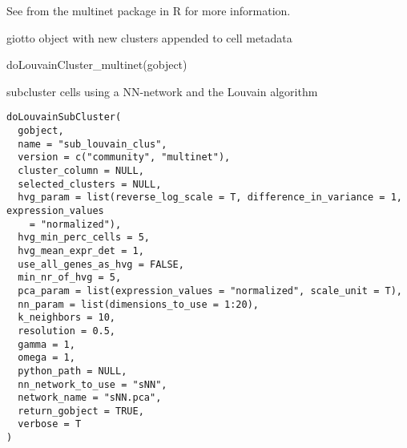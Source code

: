 \documentclass[a4paper]{book}
\begin{document}
%
\begin{Details}\relax
See  from the multinet package in R for
more information.
\end{Details}
%
\begin{Value}
giotto object with new clusters appended to cell metadata
\end{Value}
%
\begin{Examples}
\begin{ExampleCode}
    doLouvainCluster_multinet(gobject)
\end{ExampleCode}
\end{Examples}
%
\begin{Description}\relax
subcluster cells using a NN-network and the Louvain algorithm
\end{Description}
%
\begin{Usage}
\begin{verbatim}
doLouvainSubCluster(
  gobject,
  name = "sub_louvain_clus",
  version = c("community", "multinet"),
  cluster_column = NULL,
  selected_clusters = NULL,
  hvg_param = list(reverse_log_scale = T, difference_in_variance = 1, expression_values
    = "normalized"),
  hvg_min_perc_cells = 5,
  hvg_mean_expr_det = 1,
  use_all_genes_as_hvg = FALSE,
  min_nr_of_hvg = 5,
  pca_param = list(expression_values = "normalized", scale_unit = T),
  nn_param = list(dimensions_to_use = 1:20),
  k_neighbors = 10,
  resolution = 0.5,
  gamma = 1,
  omega = 1,
  python_path = NULL,
  nn_network_to_use = "sNN",
  network_name = "sNN.pca",
  return_gobject = TRUE,
  verbose = T
)
\end{verbatim}
\end{Usage}
%
\end{document}
